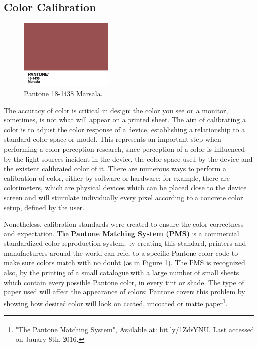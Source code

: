 \documentclass{report}
\begin{document}
\subsection{Color Calibration}
%
\begin{figure}
	\centering
    \vspace{-\baselineskip}
    \includegraphics[width=0.4\textwidth]{Pantone_Marsala.jpg}
    \caption[Pantone Matching System - Marsala]{Pantone 18-1438 Marsala.\protect\footnotemark[21]}
    \label{fig:pantone}
\end{figure}
%
The accuracy of color is critical in design: the color you see on a monitor, sometimes, is not what will appear on a printed sheet. The aim of calibrating a color is to adjust the color response of a device, establishing
a relationship to a standard color space or model. This represents an important step when performing a
color perception research, since perception of a color is influenced by the light sources incident in the
device, the color space used by the device and the existent calibrated color of it. There are numerous
ways to perform a calibration of color, either by software or hardware: for example, there are colorimeters, which
are physical devices which can be placed close to the device screen and will stimulate individually every pixel
according to a concrete color setup, defined by the user. \par
Nonetheless, calibration standards were created to ensure the color correctness and expectation. The
\textbf{Pantone Matching System (PMS)} is a commercial standardized color reproduction system; by creating
this standard, printers and manufacturers around the world can refer to a specific Pantone color code to
make sure colors match with no doubt (as in Figure \ref{fig:pantone}). The PMS is recognized also, by the printing of a small catalogue with
a large number of small sheets which contain every possible Pantone color, in every tint or shade. The type
of paper used will affect the appearance of colors: Pantone covers this problem by showing how desired
color will look on coated, uncoated or matte paper\footnote{"The Pantone Matching System\textsuperscript{\textregistered}",
Available at: \url {bit.ly/1ZdsYNU}. Last accessed on Jauary 8th, 2016.}. 
\end{document}
